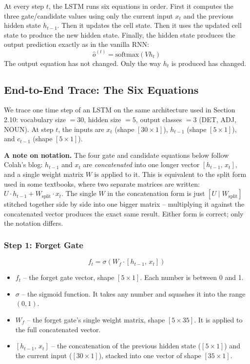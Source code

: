 At every step $t$, the LSTM runs six equations in order. First it computes the three
gate/candidate values using only the current input $x_t$ and the previous hidden state
$h_{t-1}$. Then it updates the cell state. Then it uses the updated cell state to
produce the new hidden state. Finally, the hidden state produces the output prediction
exactly as in the vanilla RNN:
\[
\hat{o}^{(t)} = \text{softmax}(V h_t)
\]
The output equation has not changed. Only the way $h_t$ is produced has changed.

\subsection{End-to-End Trace: The Six Equations}

We trace one time step of an LSTM on the same architecture used in Section 2.10:
vocabulary size $= 30$, hidden size $= 5$, output classes $= 3$ (DET, ADJ, NOUN).
At step $t$, the inputs are $x_t$ (shape $[30 \times 1]$), $h_{t-1}$ (shape
$[5 \times 1]$), and $c_{t-1}$ (shape $[5 \times 1]$).

\textbf{A note on notation.} The four gate and candidate equations below follow Colah's blog: $h_{t-1}$ and $x_t$ are \textit{concatenated} into one longer vector $[h_{t-1},\, x_t]$, and a single weight matrix $W$ is applied to it. This is equivalent to the split form used in some textbooks, where two separate matrices are written: $U \cdot h_{t-1} + W_{\text{split}} \cdot x_t$. The single $W$ in the concatenation form is just $[U \mid W_{\text{split}}]$ stitched together side by side into one bigger matrix -- multiplying it against the concatenated vector produces the exact same result. Either form is correct; only the notation differs.

\subsubsection{Step 1: Forget Gate}

\[
f_t = \sigma(W_f \cdot [h_{t-1},\, x_t])
\]

\begin{itemize}
    \item $f_t$ -- the forget gate vector, shape $[5 \times 1]$. Each number is
    between 0 and 1.
    \item $\sigma$ -- the sigmoid function. It takes any number and squashes it into
    the range $(0, 1)$.
    \item $W_f$ -- the forget gate's single weight matrix, shape $[5 \times 35]$.
    It is applied to the full concatenated vector.
    \item $[h_{t-1},\, x_t]$ -- the concatenation of the previous hidden state
    ($[5 \times 1]$) and the current input ($[30 \times 1]$), stacked into one
    vector of shape $[35 \times 1]$.
\end{itemize}

